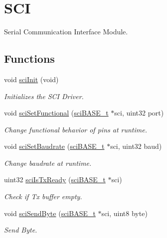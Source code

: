 \hypertarget{group__SCI}{}\section{S\+CI}
\label{group__SCI}


Serial Communication Interface Module.  


\subsection*{Functions}
\begin{DoxyCompactItemize}
\item 
void \mbox{\hyperlink{group__SCI_gae8a1d6b7274ed1af263d57fab032096a}{sci\+Init}} (void)
\begin{DoxyCompactList}\small\item\em Initializes the S\+CI Driver. \end{DoxyCompactList}\item 
void \mbox{\hyperlink{group__SCI_ga2bf2ae4e9ca71949190dd967b406b931}{sci\+Set\+Functional}} (\mbox{\hyperlink{reg__sci_8h_ad5e2af74efb062728408d4ac1b7735db}{sci\+B\+A\+S\+E\+\_\+t}} $\ast$sci, uint32 port)
\begin{DoxyCompactList}\small\item\em Change functional behavior of pins at runtime. \end{DoxyCompactList}\item 
void \mbox{\hyperlink{group__SCI_ga35d4f604e2151ca596b1e0fcca6f5606}{sci\+Set\+Baudrate}} (\mbox{\hyperlink{reg__sci_8h_ad5e2af74efb062728408d4ac1b7735db}{sci\+B\+A\+S\+E\+\_\+t}} $\ast$sci, uint32 baud)
\begin{DoxyCompactList}\small\item\em Change baudrate at runtime. \end{DoxyCompactList}\item 
uint32 \mbox{\hyperlink{group__SCI_gaafd91cc5c28a92fa211e96e06b3fc34c}{sci\+Is\+Tx\+Ready}} (\mbox{\hyperlink{reg__sci_8h_ad5e2af74efb062728408d4ac1b7735db}{sci\+B\+A\+S\+E\+\_\+t}} $\ast$sci)
\begin{DoxyCompactList}\small\item\em Check if Tx buffer empty. \end{DoxyCompactList}\item 
void \mbox{\hyperlink{group__SCI_ga8803e9ddc05ea93c80a768d0fc0eab16}{sci\+Send\+Byte}} (\mbox{\hyperlink{reg__sci_8h_ad5e2af74efb062728408d4ac1b7735db}{sci\+B\+A\+S\+E\+\_\+t}} $\ast$sci, uint8 byte)
\begin{DoxyCompactList}\small\item\em Send Byte. \end{DoxyCompactList}\item 

\end{DoxyCompactItemize}
